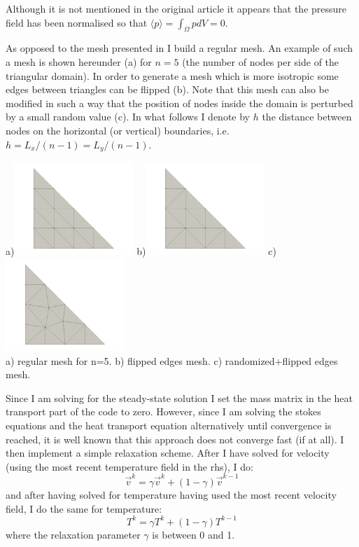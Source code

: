 Although it is not mentioned in the original article it appears that the 
pressure field has been normalised so that $\langle p \rangle = \int_\Omega p dV=0$.

As opposed to the mesh presented in \cite{jolm17} I build a regular mesh.
An example of such a mesh is shown hereunder (a) for $n=5$ (the number of nodes
per side of the triangular domain). 
In order to generate a mesh which is more isotropic some edges between 
triangles can be flipped (b). 
Note that this mesh can also be modified in such a way that the position of 
nodes inside the domain is perturbed by a small random value (c).
In what follows I denote by $h$ the distance between nodes
on the horizontal (or vertical) boundaries, i.e. $h=L_x/(n-1)=L_y/(n-1)$.
\begin{center}
a)\includegraphics[width=4.5cm]{python_codes/fieldstone_51/images/minigrid5a}
b)\includegraphics[width=4.5cm]{python_codes/fieldstone_51/images/minigrid5b}
c)\includegraphics[width=4.5cm]{python_codes/fieldstone_51/images/minigrid5c}\\
{\small a) regular mesh for n=5. b) flipped edges mesh. c) randomized+flipped edges mesh.}
\end{center}

Since I am solving for the steady-state solution I set the mass matrix in the 
heat transport part of the code to zero. However, since I am solving the stokes equations
and the heat transport equation alternatively until convergence is reached, it is well 
known that this approach does not converge fast (if at all). 
I then implement a simple relaxation scheme. After I have solved for velocity (using the 
most recent temperature field in the rhs), I do:
\[
\vec{v}^k = \gamma \vec{v}^k + (1-\gamma) \vec{v}^{k-1}
\]
and after having solved for temperature having used the most recent velocity field, 
I do the same for temperature:
\[
{T}^k = \gamma {T}^k + (1-\gamma) {T}^{k-1}
\]
where the relaxation parameter $\gamma$ is between 0 and 1.




